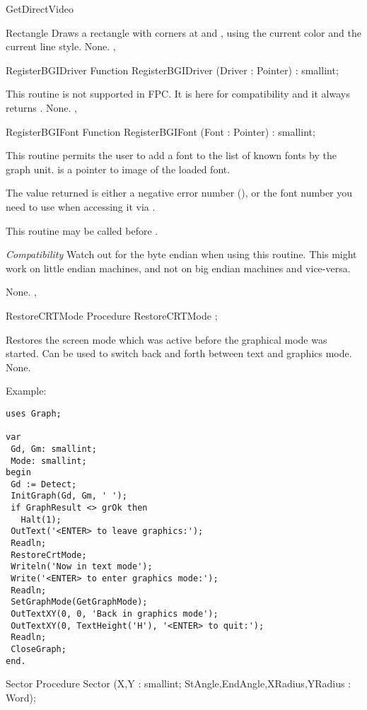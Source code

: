\begin{function}{GetDirectVideo}
\begin{procedure}{Rectangle}
\Description
Draws a rectangle with
corners at  and , using the current color and
the current line style.
\Errors
None.
\SeeAlso
{}, 
\end{procedure}
\begin{function}{RegisterBGIDriver}
\Declaration
Function RegisterBGIDriver (Driver : Pointer) : smallint;

\Description
This routine is not supported in FPC. It is here for compatibility and it
always returns .
\Errors
None.
\SeeAlso
{},
\end{function}
\begin{function}{RegisterBGIFont}
\Declaration
Function RegisterBGIFont (Font : Pointer) : smallint;

\Description
This routine permits the user to add a font to the list of known fonts
by the graph unit.  is a pointer to image of the loaded font.

The value returned is either a negative error number (),
or the font number you need to use when accessing it via .

This routine may be called before .


\textit{Compatibility}
Watch out for the byte endian when using this routine. This might work
on little endian machines, and not on big endian machines and vice-versa.


\Errors
None.
\SeeAlso
{},
\end{function}
\begin{procedure}{RestoreCRTMode}
\Declaration
Procedure RestoreCRTMode ;

\Description
Restores the screen mode which was active before
the graphical mode was started. Can be used to switch back and forth
between text and graphics mode.
\Errors
None.
\SeeAlso
{}


\end{procedure}

Example:
\begin{verbatim}
uses Graph;

var
 Gd, Gm: smallint;
 Mode: smallint;
begin
 Gd := Detect;
 InitGraph(Gd, Gm, ' ');
 if GraphResult <> grOk then
   Halt(1);
 OutText('<ENTER> to leave graphics:');
 Readln;
 RestoreCrtMode;
 Writeln('Now in text mode');
 Write('<ENTER> to enter graphics mode:');
 Readln;
 SetGraphMode(GetGraphMode);
 OutTextXY(0, 0, 'Back in graphics mode');
 OutTextXY(0, TextHeight('H'), '<ENTER> to quit:');
 Readln;
 CloseGraph;
end.
\end{verbatim}
\begin{procedure}{Sector}
\Declaration
Procedure Sector (X,Y : smallint; StAngle,EndAngle,XRadius,YRadius : Word);


\end{procedure}
\end{function}
